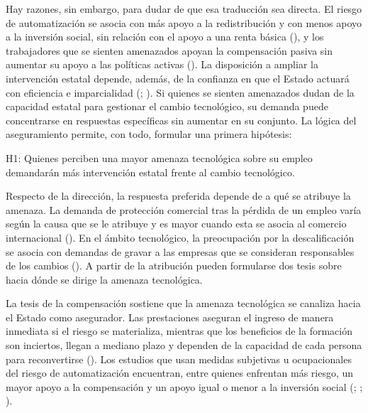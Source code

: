 \documentclass[
  spanish,
  12pt,
]{article}
\begin{document}
Hay razones, sin embargo, para dudar de que esa traducción sea directa.
El riesgo de automatización se asocia con más apoyo a la redistribución
y con menos apoyo a la inversión social, sin relación con el apoyo a una
renta básica (), y los trabajadores que se sienten amenazados apoyan la
compensación pasiva sin aumentar su apoyo a las políticas activas
(). La
disposición a ampliar la intervención estatal depende, además, de la
confianza en que el Estado actuará con eficiencia e imparcialidad
(;
). Si
quienes se sienten amenazados dudan de la capacidad estatal para
gestionar el cambio tecnológico, su demanda puede concentrarse en
respuestas específicas sin aumentar en su conjunto. La lógica del
aseguramiento permite, con todo, formular una primera hipótesis:

\begin{tcolorbox}[enhanced jigsaw, arc=.35mm, bottomrule=.15mm, breakable, colback=white, colframe=quarto-callout-note-color-frame, left=2mm, leftrule=.75mm, opacityback=0, rightrule=.15mm, toprule=.15mm]

H1: Quienes perciben una mayor amenaza tecnológica sobre su empleo
demandarán más intervención estatal frente al cambio tecnológico.

\end{tcolorbox}

Respecto de la dirección, la respuesta preferida depende de a qué se
atribuye la amenaza. La demanda de protección comercial tras la pérdida
de un empleo varía según la causa que se le atribuye y es mayor cuando
esta se asocia al comercio internacional
().
En el ámbito tecnológico, la preocupación por la descalificación se
asocia con demandas de gravar a las empresas que se consideran
responsables de los cambios
(). A partir
de la atribución pueden formularse dos tesis sobre hacia dónde se dirige
la amenaza tecnológica.

La tesis de la compensación sostiene que la amenaza tecnológica se
canaliza hacia el Estado como asegurador. Las prestaciones aseguran el
ingreso de manera inmediata si el riesgo se materializa, mientras que
los beneficios de la formación son inciertos, llegan a mediano plazo y
dependen de la capacidad de cada persona para reconvertirse
(). Los
estudios que usan medidas subjetivas u ocupacionales del riesgo de
automatización encuentran, entre quienes enfrentan más riesgo, un mayor
apoyo a la compensación y un apoyo igual o menor a la inversión social
(;
;
).
\end{document}
